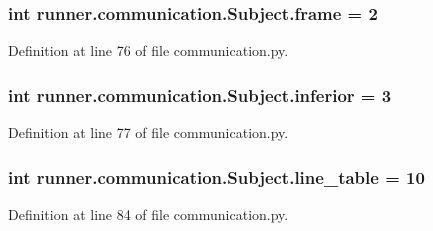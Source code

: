 \subsubsection[{frame}]{\setlength{\rightskip}{0pt plus 5cm}int runner.\+communication.\+Subject.\+frame = 2\hspace{0.3cm}{\ttfamily [static]}}\label{classrunner_1_1communication_1_1Subject_a97b4cc6e3172e21385480bcdb8715973}


Definition at line 76 of file communication.\+py.

\hypertarget{classrunner_1_1communication_1_1Subject_a7ffb1cd8221bb1c96fba0e943d39a608}{}
\subsubsection[{inferior}]{\setlength{\rightskip}{0pt plus 5cm}int runner.\+communication.\+Subject.\+inferior = 3\hspace{0.3cm}{\ttfamily [static]}}\label{classrunner_1_1communication_1_1Subject_a7ffb1cd8221bb1c96fba0e943d39a608}


Definition at line 77 of file communication.\+py.

\hypertarget{classrunner_1_1communication_1_1Subject_a009dfec8f4fe8a2adebe3c8a94ed1730}{}
\subsubsection[{line\+\_\+table}]{\setlength{\rightskip}{0pt plus 5cm}int runner.\+communication.\+Subject.\+line\+\_\+table = 10\hspace{0.3cm}{\ttfamily [static]}}\label{classrunner_1_1communication_1_1Subject_a009dfec8f4fe8a2adebe3c8a94ed1730}


Definition at line 84 of file communication.\+py.

\hypertarget{classrunner_1_1communication_1_1Subject_a23b2d4b86ba5b310a6566381a25c83d9}{}
